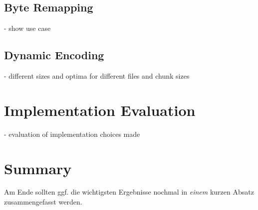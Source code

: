 \subsection{Byte Remapping}
- show use case \\
\subsection{Dynamic Encoding}
- different sizes and optima for different files and chunk sizes \\


\section{Implementation Evaluation}
\label{ch:Conceptual Design:sec:Implementation Evaluation}
- evaluation of implementation choices made


\section{Summary}
\label{ch:Conceptual Design:sec:Summary}

Am Ende sollten ggf. die wichtigsten Ergebnisse nochmal in \emph{einem}
kurzen Absatz zusammengefasst werden.

